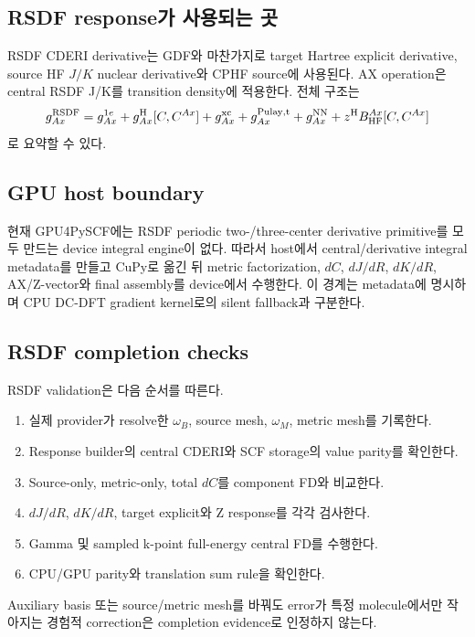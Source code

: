 \subsection{RSDF response가 사용되는 곳}

RSDF CDERI derivative는 GDF와 마찬가지로 target Hartree explicit derivative, source HF
$J/K$ nuclear derivative와 CPHF source에 사용된다. AX operation은 central RSDF J/K를
transition density에 적용한다. 전체 구조는
\begin{equation}
  g_{Ax}^{\mathrm{RSDF}}
  =g_{Ax}^{1e}+g_{Ax}^{\mathrm H}[C,C^{Ax}]
   +g_{Ax}^{\mathrm{xc}}+g_{Ax}^{\mathrm{Pulay,t}}
   +g_{Ax}^{\mathrm{NN}}+z^{\mathrm{H}} B_{\mathrm{HF}}^{Ax}[C,C^{Ax}]
  \label{eq:rsdf-total-gradient}
\end{equation}
로 요약할 수 있다.

\subsection{GPU host boundary}

현재 GPU4PySCF에는 RSDF periodic two-/three-center derivative primitive를 모두 만드는
device integral engine이 없다. 따라서 host에서 central/derivative integral metadata를
만들고 CuPy로 옮긴 뒤 metric factorization, $dC$, $dJ/dR$, $dK/dR$, AX/Z-vector와 final
assembly를 device에서 수행한다. 이 경계는 metadata에 명시하며 CPU DC-DFT gradient
kernel로의 silent fallback과 구분한다.

\subsection{RSDF completion checks}

RSDF validation은 다음 순서를 따른다.

\begin{enumerate}
  \item 실제 provider가 resolve한 $\omega_B$, source mesh, $\omega_M$, metric mesh를 기록한다.
  \item Response builder의 central CDERI와 SCF storage의 value parity를 확인한다.
  \item Source-only, metric-only, total $dC$를 component FD와 비교한다.
  \item $dJ/dR$, $dK/dR$, target explicit와 Z response를 각각 검사한다.
  \item Gamma 및 sampled k-point full-energy central FD를 수행한다.
  \item CPU/GPU parity와 translation sum rule을 확인한다.
\end{enumerate}

Auxiliary basis 또는 source/metric mesh를 바꿔도 error가 특정 molecule에서만 작아지는
경험적 correction은 completion evidence로 인정하지 않는다.

